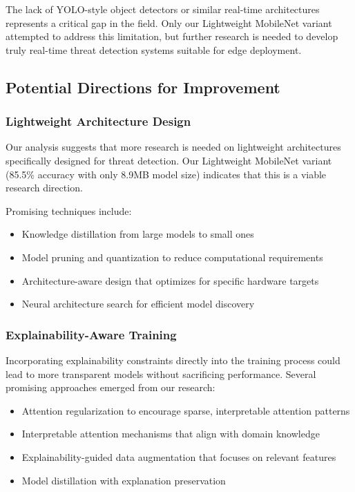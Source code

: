 \documentclass[conference,compsoc]{IEEEtran}
\begin{document}
The lack of YOLO-style object detectors or similar real-time architectures represents a critical gap in the field. Only our Lightweight MobileNet variant attempted to address this limitation, but further research is needed to develop truly real-time threat detection systems suitable for edge deployment.

\subsection{Potential Directions for Improvement}

\subsubsection{Lightweight Architecture Design}
Our analysis suggests that more research is needed on lightweight architectures specifically designed for threat detection. Our Lightweight MobileNet variant (85.5\% accuracy with only 8.9MB model size) indicates that this is a viable research direction.

Promising techniques include:
\begin{itemize}
    \item Knowledge distillation from large models to small ones
    \item Model pruning and quantization to reduce computational requirements
    \item Architecture-aware design that optimizes for specific hardware targets
    \item Neural architecture search for efficient model discovery
\end{itemize}

\subsubsection{Explainability-Aware Training}
Incorporating explainability constraints directly into the training process could lead to more transparent models without sacrificing performance. Several promising approaches emerged from our research:
\begin{itemize}
    \item Attention regularization to encourage sparse, interpretable attention patterns
    \item Interpretable attention mechanisms that align with domain knowledge
    \item Explainability-guided data augmentation that focuses on relevant features
    \item Model distillation with explanation preservation
\end{itemize}
\end{document}
